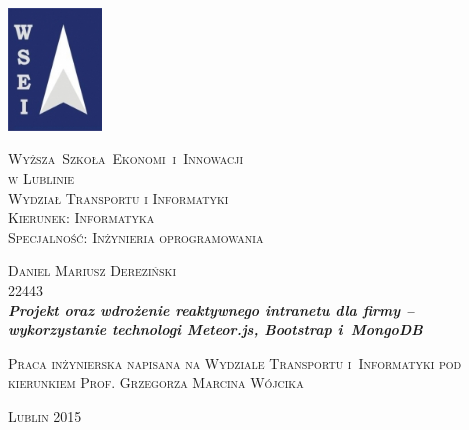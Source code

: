 \noindent

\begin{center}\small
\includegraphics[width=25mm]{./title/logowsei.jpg}
\end{center}

\begin{center}
{\LARGE\textsc{Wyższa~Szkoła~Ekonomi~i~Innowacji \\ w Lublinie}}\\[0.5cm]
{\Large\textsc{Wydział Transportu i Informatyki}}\\[0.5cm]
{\Large\textsc{Kierunek:  Informatyka}}\\[0.5cm]
{\Large\textsc{Specjalność: Inżynieria oprogramowania}}\\[0.5cm]
\end{center}

\vspace{1.0cm}

\begin{center}
\begin{large}
\textsc{Daniel Mariusz Dereziński} \\
22443 \\[0.5cm]

\huge{\bf{\it{Projekt oraz wdrożenie reaktywnego intranetu dla firmy – wykorzystanie technologi Meteor.js, Bootstrap i~MongoDB}}} \\[0.5cm]
\end{large}
\end{center}
\vspace{2.0cm}

\begin{flushright}
\begin{minipage}{7.4cm}
\begin{spacing}{1.0}
\textsc{Praca inżynierska napisana na Wydziale Transportu i~Informatyki pod kierunkiem Prof. Grzegorza Marcina Wójcika}
\end{spacing}
\end{minipage}
\end{flushright}
\vfill

\begin{center}
\textsc{Lublin 2015}
\end{center}
